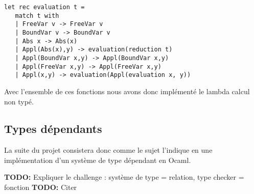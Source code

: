 \documentclass{article}
\newcommand{\TODO}[1]{\textbf{TODO:} #1}
\theoremstyle{definition}
\theoremstyle{remark}
\begin{document}
\begin{verbatim}
let rec evaluation t =
   match t with  
   | FreeVar v -> FreeVar v  
   | BoundVar v -> BoundVar v  
   | Abs x -> Abs(x) 
   | Appl(Abs(x),y) -> evaluation(reduction t) 
   | Appl(BoundVar x,y) -> Appl(BoundVar x,y)  
   | Appl(FreeVar x,y) -> Appl(FreeVar x,y)  
   | Appl(x,y) -> evaluation(Appl(evaluation x, y))
\end{verbatim}

Avec l'ensemble de ces fonctions nous avons donc implémenté le lambda
calcul non typé.


\subsection{Types dépendants}


La suite du projet consistera donc comme le sujet l'indique en une
implémentation d'un système de type dépendant en Ocaml.

\TODO{Expliquer le challenge : système de type = relation, type checker = fonction}
\TODO{Citer \citep{loeh:tuto-dependant,coquand:mini-tt}}




 
\end{document}
